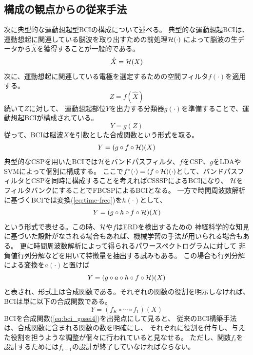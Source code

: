 \subsection{構成の観点からの従来手法}
次に典型的な運動想起型BCIの構成について述べる。
典型的な運動想起BCIは、運動想起に関連している脳波を取り出すための前処理\(\cal H(\cdot)\)
によって脳波の生データから\(\hat X\)を獲得することが一般的である。
\begin{equation}
    \hat X = {\cal H}(X)
    \label{eq:bandpass}
\end{equation}
次に、運動想起に関連している電極を選定するための空間フィルタ\(f(\cdot)\)を適用する。
\begin{equation}
    Z = f(\hat X)
    \label{eq:spatfilter}
\end{equation}
続いて\(Z\)に対して、
運動想起部位\(Y\)を出力する分類器\(g(\cdot)\)を準備することで、運動想起BCIが構成されている。
\begin{equation}
    Y = g(Z)
    \label{eq:classifier}
\end{equation}
従って、BCIは脳波\(X\)を引数とした合成関数という形式を取る。
\begin{equation}
    Y = (g\circ f \circ {\cal H})(X)
    \label{eq:bci_gosei}
\end{equation}
典型的なCSPを用いたBCIでは\(\cal H\)をバンドパスフィルタ、\(f\)をCSP、\(g\)をLDAやSVMによって個別に構成する。
ここで\(f^*(\cdot)=(f\circ{\cal H})(\cdot)\)として、バンドパスフィルタとCSPを同時に構成することを考えればCSSSPによるBCIになり、
\(\cal H\)をフィルタバンクにすることでFBCSPによるBCIとなる。
一方で時間周波数解析に基づくBCIでは変換(\ref{eq:time-freq})を\(h(\cdot)\)として、
\begin{equation}
    Y = (g\circ h \circ f \circ {\cal H})(X)
    \label{eq:bci_gosei2}
\end{equation}
という形式で表せる。この時、\(\cal H\)や\(f\)はERDを検出するための
神経科学的な知見に基づいた設計がなされる場合もあれば、機械学習の手法が用いられる場合もある。
更に時間周波数解析によって得られるパワースペクトログラムに対して
非負値行列分解などを用いて特徴量を抽出する試みもある\cite{kNMF,kNMF2}。
この場合も行列分解による変換を\(a(\cdot)\)と置けば
\begin{equation}
    Y = (g\circ a\circ h\circ f\circ {\cal H})(X)
    \label{eq:bci_gosei3}
\end{equation}
と表され、形式上は合成関数である。それぞれの関数の役割を明示しなければ、BCIは単に以下の合成関数である。
\begin{equation}
    Y = (f_K\circ \cdots \circ f_1)(X)
    \label{eq:bci_gosei4}
\end{equation}
BCIを合成関数(\ref{eq:bci_gosei4})を出発点にして見ると、
従来のBCI構築手法は、合成関数に含まれる関数の数を明確にし、
それぞれに役割を付与し、与えた役割を担うような調整が個々に行われていると見なせる。
ただし、関数\(f_i\)を設計するためには\(f_{i-1}\)の設計が終了していなければならない。

